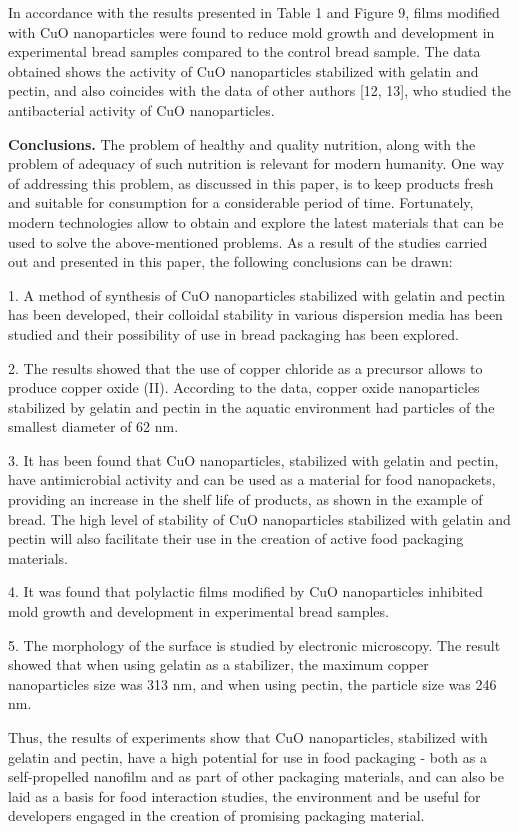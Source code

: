 \begin{multicols}{2}
In accordance with the results presented in Table 1 and Figure 9, films
modified with CuO nanoparticles were found to reduce mold growth and
development in experimental bread samples compared to the control bread
sample. The data obtained shows the activity of CuO nanoparticles
stabilized with gelatin and pectin, and also coincides with the data of
other authors {[}12, 13{]}, who studied the antibacterial activity of
CuO nanoparticles.

{\bfseries Conclusions.} The problem of healthy and quality nutrition,
along with the problem of adequacy of such nutrition is relevant for
modern humanity. One way of addressing this problem, as discussed in
this paper, is to keep products fresh and suitable for consumption for a
considerable period of time. Fortunately, modern technologies allow to
obtain and explore the latest materials that can be used to solve the
above-mentioned problems. As a result of the studies carried out and
presented in this paper, the following conclusions can be drawn:

1. A method of synthesis of CuO nanoparticles stabilized with gelatin
and pectin has been developed, their colloidal stability in various
dispersion media has been studied and their possibility of use in bread
packaging has been explored.

2. The results showed that the use of copper chloride as a precursor
allows to produce copper oxide (II). According to the data, copper oxide
nanoparticles stabilized by gelatin and pectin in the aquatic
environment had particles of the smallest diameter of 62 nm.

3. It has been found that CuO nanoparticles, stabilized with gelatin and
pectin, have antimicrobial activity and can be used as a material for
food nanopackets, providing an increase in the shelf life of products,
as shown in the example of bread. The high level of stability of CuO
nanoparticles stabilized with gelatin and pectin will also facilitate
their use in the creation of active food packaging materials.

4. It was found that polylactic films modified by CuO nanoparticles
inhibited mold growth and development in experimental bread samples.

5. The morphology of the surface is studied by electronic microscopy.
The result showed that when using gelatin as a stabilizer, the maximum
copper nanoparticles size was 313 nm, and when using pectin, the
particle size was 246 nm.

Thus, the results of experiments show that CuO nanoparticles, stabilized
with gelatin and pectin, have a high potential for use in food packaging
- both as a self-propelled nanofilm and as part of other packaging
materials, and can also be laid as a basis for food interaction studies,
the environment and be useful for developers engaged in the creation of
promising packaging material.
\end{multicols}

